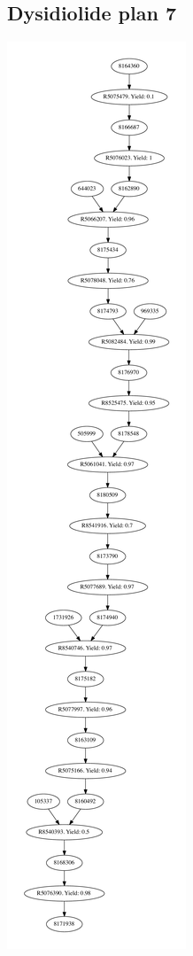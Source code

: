 \documentclass[a4paper,10pt,titlepage]{paper}
\begin{document}
\subsection{Dysidiolide plan 7}
\centering
\includegraphics[scale=0.27]{Synteseplaner/Dysidiolide/plan7.pdf}
\label{Appendix::Dysidiolide7}
\end{document}
